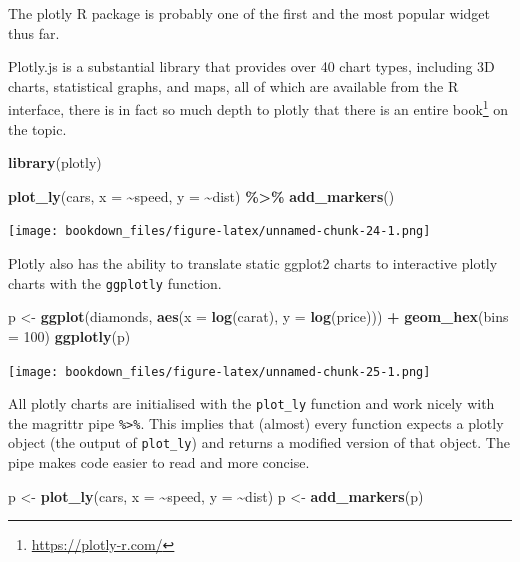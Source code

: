 \documentclass[
]{krantz}
\makeatletter
\newenvironment{Shaded}{\begin{snugshade}}{\end{snugshade}}
\newcommand{\DataTypeTok}[1]{\textcolor[rgb]{0.27,0.27,0.27}{#1}}
\newcommand{\DecValTok}[1]{\textcolor[rgb]{0.06,0.06,0.06}{#1}}
\newcommand{\KeywordTok}[1]{\textcolor[rgb]{0.27,0.27,0.27}{\textbf{#1}}}
\newcommand{\NormalTok}[1]{#1}
\newcommand{\OperatorTok}[1]{\textcolor[rgb]{0.43,0.43,0.43}{\textbf{#1}}}
\newcommand{\StringTok}[1]{\textcolor[rgb]{0.5,0.5,0.5}{#1}}
\renewcommand{\href}[2]{#2\footnote{\url{#1}}}
\newenvironment{kframe}{%
\medskip{}
\setlength{\fboxsep}{.8em}
 \def\at@end@of@kframe{}%
 \ifinner\ifhmode%
  \def\at@end@of@kframe{\end{minipage}}%
  \begin{minipage}{\columnwidth}%
 \fi\fi%
 \def\FrameCommand##1{\hskip\@totalleftmargin \hskip-\fboxsep
 \colorbox{shadecolor}{##1}\hskip-\fboxsep
     \hskip-\linewidth \hskip-\@totalleftmargin \hskip\columnwidth}%
 \MakeFramed {\advance\hsize-\width
   \@totalleftmargin\z@ \linewidth\hsize
   \@setminipage}}%
 {\par\unskip\endMakeFramed%
 \at@end@of@kframe}
\renewenvironment{Shaded}{\begin{kframe}}{\end{kframe}}
\makeatother
\begin{document}
The plotly \citep{R-plotly} R package is probably one of the first and the most popular widget thus far.

Plotly.js is a substantial library that provides over 40 chart types, including 3D charts, statistical graphs, and maps, all of which are available from the R interface, there is in fact so much depth to plotly that there is an entire \href{https://plotly-r.com/}{book} on the topic.

\begin{Shaded}
\begin{Highlighting}[]
\KeywordTok{library}\NormalTok{(plotly)}

\KeywordTok{plot\_ly}\NormalTok{(cars, }\DataTypeTok{x =} \OperatorTok{\textasciitilde{}}\NormalTok{speed, }\DataTypeTok{y =} \OperatorTok{\textasciitilde{}}\NormalTok{dist) }\OperatorTok{\%>\%}\StringTok{ }
\StringTok{  }\KeywordTok{add\_markers}\NormalTok{()}
\end{Highlighting}
\end{Shaded}

\texttt{[image: bookdown\_files/figure-latex/unnamed-chunk-24-1.png]}

Plotly also has the ability to translate static ggplot2 \citep{R-ggplot2} charts to interactive plotly charts with the \texttt{ggplotly} function.

\begin{Shaded}
\begin{Highlighting}[]
\NormalTok{p <{-}}\StringTok{ }\KeywordTok{ggplot}\NormalTok{(diamonds, }\KeywordTok{aes}\NormalTok{(}\DataTypeTok{x =} \KeywordTok{log}\NormalTok{(carat), }\DataTypeTok{y =} \KeywordTok{log}\NormalTok{(price))) }\OperatorTok{+}\StringTok{ }
\StringTok{  }\KeywordTok{geom\_hex}\NormalTok{(}\DataTypeTok{bins =} \DecValTok{100}\NormalTok{)}
\KeywordTok{ggplotly}\NormalTok{(p)}
\end{Highlighting}
\end{Shaded}

\texttt{[image: bookdown\_files/figure-latex/unnamed-chunk-25-1.png]}

All plotly charts are initialised with the \texttt{plot\_ly} function and work nicely with the magrittr \citep{R-magrittr} pipe \texttt{\%\textgreater{}\%}. This implies that (almost) every function expects a plotly object (the output of \texttt{plot\_ly}) and returns a modified version of that object. The pipe makes code easier to read and more concise.

\begin{Shaded}
\begin{Highlighting}[]
\NormalTok{p <{-}}\StringTok{ }\KeywordTok{plot\_ly}\NormalTok{(cars, }\DataTypeTok{x =} \OperatorTok{\textasciitilde{}}\NormalTok{speed, }\DataTypeTok{y =} \OperatorTok{\textasciitilde{}}\NormalTok{dist) }
\NormalTok{p <{-}}\StringTok{ }\KeywordTok{add\_markers}\NormalTok{(p)}
\end{Highlighting}
\end{Shaded}
\end{document}
